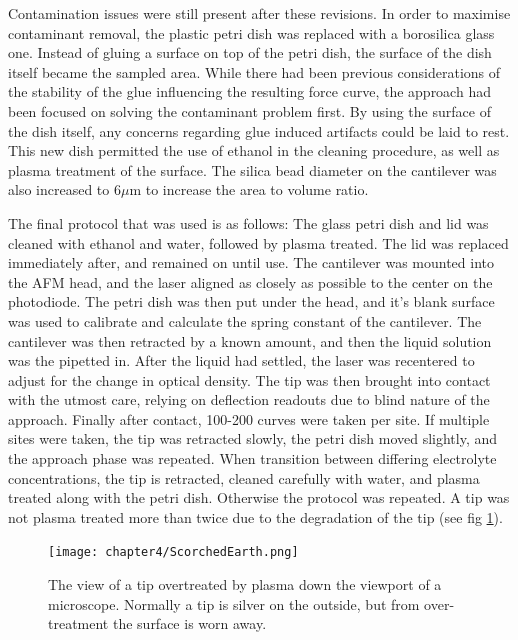 Contamination issues were still present after these revisions. In order to maximise contaminant removal, the plastic petri dish was replaced with a borosilica glass one. Instead of gluing a surface on top of the petri dish, the surface of the dish itself became the sampled area. While there had been previous considerations of the stability of the glue influencing the resulting force curve, the approach had been focused on solving the contaminant problem first. By using the surface of the dish itself, any concerns regarding glue induced artifacts could be laid to rest. This new dish permitted the use of ethanol in the cleaning procedure, as well as plasma treatment of the surface. The silica bead diameter on the cantilever was also increased to 6$\mu$m to increase the area to volume ratio.

The final protocol that was used is as follows: The glass petri dish and lid was cleaned with ethanol and water, followed by plasma treated. The lid was replaced immediately after, and remained on until use. The cantilever was mounted into the AFM head, and the laser aligned as closely as possible to the center on the photodiode. The petri dish was then put under the head, and it's blank surface was used to calibrate and calculate the spring constant of the cantilever. The cantilever was then retracted by a known amount, and then the liquid solution was the pipetted in. After the liquid had settled, the laser was recentered to adjust for the change in optical density. The tip was then brought into contact with the utmost care, relying on deflection readouts due to blind nature of the approach. Finally after contact, 100-200 curves were taken per site. If multiple sites were taken, the tip was retracted slowly, the petri dish moved slightly, and the approach phase was repeated. When transition between differing electrolyte concentrations, the tip is retracted, cleaned carefully with water, and plasma treated along with the petri dish. Otherwise the protocol was repeated. A tip was not plasma treated more than twice due to the degradation of the tip (see fig \ref{fig:ScorchedEarth}).


\begin{figure}[h!]    
        \begin{center}
          \texttt{[image: chapter4/ScorchedEarth.png]}
\end{center}
\caption{The view of a tip overtreated by plasma down the viewport of a microscope. Normally a tip is silver on the outside, but from over-treatment the surface is worn away.}
\label{fig:ScorchedEarth}                 
\end{figure}


